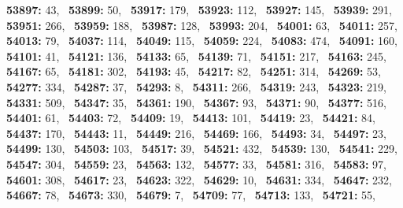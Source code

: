 \textbf{53897:} 43,\allowbreak~ 
\textbf{53899:} 50,\allowbreak~ 
\textbf{53917:} 179,\allowbreak~ 
\textbf{53923:} 112,\allowbreak~ 
\textbf{53927:} 145,\allowbreak~ 
\textbf{53939:} 291,\allowbreak~ 
\textbf{53951:} 266,\allowbreak~ 
\textbf{53959:} 188,\allowbreak~ 
\textbf{53987:} 128,\allowbreak~ 
\textbf{53993:} 204,\allowbreak~ 
\textbf{54001:} 63,\allowbreak~ 
\textbf{54011:} 257,\allowbreak~ 
\textbf{54013:} 79,\allowbreak~ 
\textbf{54037:} 114,\allowbreak~ 
\textbf{54049:} 115,\allowbreak~ 
\textbf{54059:} 224,\allowbreak~ 
\textbf{54083:} 474,\allowbreak~ 
\textbf{54091:} 160,\allowbreak~ 
\textbf{54101:} 41,\allowbreak~ 
\textbf{54121:} 136,\allowbreak~ 
\textbf{54133:} 65,\allowbreak~ 
\textbf{54139:} 71,\allowbreak~ 
\textbf{54151:} 217,\allowbreak~ 
\textbf{54163:} 245,\allowbreak~ 
\textbf{54167:} 65,\allowbreak~ 
\textbf{54181:} 302,\allowbreak~ 
\textbf{54193:} 45,\allowbreak~ 
\textbf{54217:} 82,\allowbreak~ 
\textbf{54251:} 314,\allowbreak~ 
\textbf{54269:} 53,\allowbreak~ 
\textbf{54277:} 334,\allowbreak~ 
\textbf{54287:} 37,\allowbreak~ 
\textbf{54293:} 8,\allowbreak~ 
\textbf{54311:} 266,\allowbreak~ 
\textbf{54319:} 243,\allowbreak~ 
\textbf{54323:} 219,\allowbreak~ 
\textbf{54331:} 509,\allowbreak~ 
\textbf{54347:} 35,\allowbreak~ 
\textbf{54361:} 190,\allowbreak~ 
\textbf{54367:} 93,\allowbreak~ 
\textbf{54371:} 90,\allowbreak~ 
\textbf{54377:} 516,\allowbreak~ 
\textbf{54401:} 61,\allowbreak~ 
\textbf{54403:} 72,\allowbreak~ 
\textbf{54409:} 19,\allowbreak~ 
\textbf{54413:} 101,\allowbreak~ 
\textbf{54419:} 23,\allowbreak~ 
\textbf{54421:} 84,\allowbreak~ 
\textbf{54437:} 170,\allowbreak~ 
\textbf{54443:} 11,\allowbreak~ 
\textbf{54449:} 216,\allowbreak~ 
\textbf{54469:} 166,\allowbreak~ 
\textbf{54493:} 34,\allowbreak~ 
\textbf{54497:} 23,\allowbreak~ 
\textbf{54499:} 130,\allowbreak~ 
\textbf{54503:} 103,\allowbreak~ 
\textbf{54517:} 39,\allowbreak~ 
\textbf{54521:} 432,\allowbreak~ 
\textbf{54539:} 130,\allowbreak~ 
\textbf{54541:} 229,\allowbreak~ 
\textbf{54547:} 304,\allowbreak~ 
\textbf{54559:} 23,\allowbreak~ 
\textbf{54563:} 132,\allowbreak~ 
\textbf{54577:} 33,\allowbreak~ 
\textbf{54581:} 316,\allowbreak~ 
\textbf{54583:} 97,\allowbreak~ 
\textbf{54601:} 308,\allowbreak~ 
\textbf{54617:} 23,\allowbreak~ 
\textbf{54623:} 322,\allowbreak~ 
\textbf{54629:} 10,\allowbreak~ 
\textbf{54631:} 334,\allowbreak~ 
\textbf{54647:} 232,\allowbreak~ 
\textbf{54667:} 78,\allowbreak~ 
\textbf{54673:} 330,\allowbreak~ 
\textbf{54679:} 7,\allowbreak~ 
\textbf{54709:} 77,\allowbreak~ 
\textbf{54713:} 133,\allowbreak~ 
\textbf{54721:} 55,\allowbreak~ 
